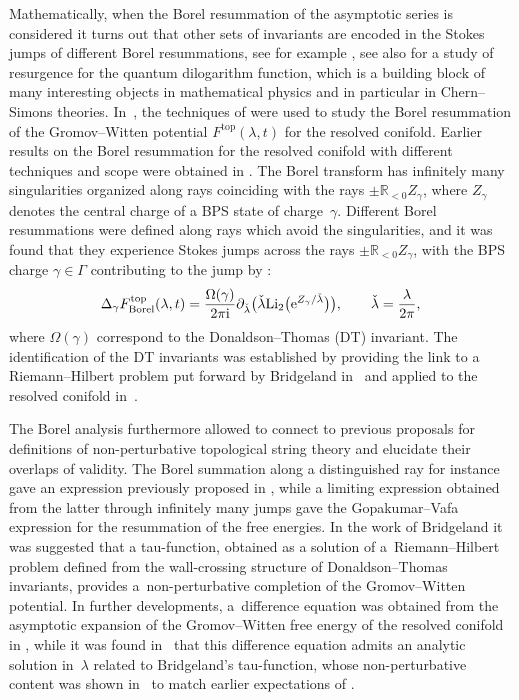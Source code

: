 \documentclass[pdftex]{sigma}
\numberwithin{equation}{section}
\begin{document}
Mathematically, when the Borel resummation of the asymptotic series is considered it turns out that other sets of invariants are encoded in the Stokes jumps of different Borel resummations, see for example \cite{Couso-Santamaria:2016vcc,Garoufalidis:2020nut,Garoufalidis:2020xec,Gu:2021ize}, see also \cite{garoufalidis2020resurgence} for a study of resurgence for the quantum dilogarithm function, which is a building block of many interesting objects in mathematical physics and in particular in Chern--Simons theories. In~\cite{ASTT21}, the techniques of \cite{garoufalidis2020resurgence} were used to study the Borel resummation of the Gromov--Witten potential $F^{\mathrm{top}}(\lambda,t)$ for the resolved conifold. Earlier results on the Borel resummation for the resolved conifold with different techniques and scope were obtained in \cite{Hatsuda:2015owa,Pasquetti:2009jg}. The Borel transform has infinitely many singularities organized along rays coinciding with the rays $\pm \mathbb{R}_{<0}Z_{\gamma}$, where $Z_{\gamma}$ denotes the central charge of a BPS state of charge~$\gamma$. Different Borel resummations were defined along rays which avoid the singularities, and it was found that they experience Stokes jumps across the rays $\pm \mathbb{R}_{<0}Z_{\gamma}$, with the BPS charge $\gamma \in \Gamma$ contributing to the jump by \cite{ASTT21}:
\begin{equation}\label{eq:topstringjumps}
 \Delta_{\gamma} F^{\rm top}_{\textrm{Borel}} (\lambda,t) = \frac{\Omega(\gamma)}{2\pi \mathrm{i}} \partial_{\check{\lambda}} \big( \check{\lambda} {\rm Li}_2\big({\rm e}^{Z_{\gamma}/\check{\lambda}}\big)\big), \qquad \check{\lambda}=\frac{\lambda}{2\pi},
\end{equation}
where $\Omega(\gamma)$ correspond to the Donaldson--Thomas (DT) invariant. The identification of the DT invariants was established by providing the link to a Riemann--Hilbert problem put forward by Bridgeland in~\cite{Bridgeland1} and applied to the resolved conifold in~\cite{BridgelandCon}.

The Borel analysis furthermore allowed to connect to previous proposals for definitions of non-perturbative topological string theory and elucidate their overlaps of validity. The Borel summation along a distinguished ray for instance gave an expression previously proposed in \cite{Hatsuda:2013oxa,Hatsuda:2015owa}, while a limiting expression obtained from the latter through infinitely many jumps gave the Gopakumar--Vafa expression for the resummation of the free energies. In the work of Bridgeland it was suggested that a tau-function, obtained as a solution of a~Riemann--Hilbert problem defined from the wall-crossing structure of Donaldson--Thomas invariants, provides a~non-perturbative completion of the Gromov--Witten potential. In further developments, a~difference equation was obtained from the asymptotic expansion of the Gromov--Witten free energy of the resolved conifold in \cite{alim2020difference}, while it was found in~\cite{Alim:2021lld} that this difference equation admits an analytic solution in~$\lambda$ related to Bridgeland's tau-function, whose non-perturbative content was shown in~\cite{Alim:2021ukq} to match earlier expectations of \cite{Hatsuda:2013oxa,Hatsuda:2015owa}.
\end{document}
